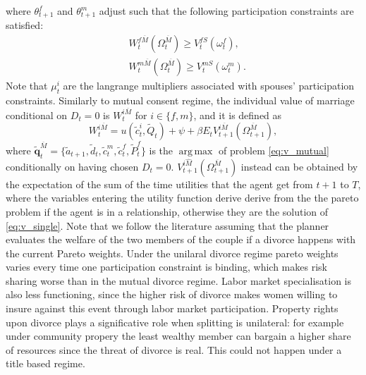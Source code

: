 \documentclass[12pt]{article}
\numberwithin{table}{section}
\DeclareMathOperator*{\argmax}{arg\,max}
\begin{document}
where $\theta^f_{t+1}$ and $\theta^m_{t+1}$ adjust such that the following participation constraints are satisfied:
\begin{equation}\label{eq:p_cons_mar}
\begin{split}
&
W^{f\overline{M}}_{t}(\Omega^{\overline{M}}_{t})\geq V_{t}^{fS}(\omega^f_{t}),\\ &
W^{m\overline{M}}_{t}(\Omega^{\overline{M}}_{t})\geq V_{t}^{mS}(\omega^m_{t}). 
\end{split}
\end{equation}
Note that $\mu^i_t$ are the langrange multipliers associated with spouses' participation constraints.
Similarly to mutual consent regime, the individual value of marriage conditional on $D_t=0$ is  $W_{t}^{i\overline{M}}$ for $i\in\{f,m\}$, and it is defined as 
\begin{equation}
W_{t}^{i\overline{M}}=u(\tilde{c}_t^{i},\tilde{Q}_t)+\psi+\beta E_t V_{t+1}^{i\overline{M}}(\Omega^{\overline{M}}_{t+1}),
\end{equation}
where
$\mathbf{\tilde{q}}^{\overline{M}}_t=\{\tilde{a}_{t+1},\tilde{d}_{t},\tilde{c}^{m}_{t},\tilde{c}^{f}_{t},\tilde{P}^{f}_t\}$ is the $\argmax$ of problem \eqref{eq:v_mutual} conditionally on having chosen $D_t=0$. $V_{t+1}^{i\hat{M}}(\Omega^{\overline{M}}_{t+1})$ instead can be obtained by the expectation of the sum of the time utilities that the agent get from $t+1$ to $T$, where the variables entering the utility function derive derive from the the pareto problem if the agent is in a relationship, otherwise they are the solution of \eqref{eq:v_single}. Note that we follow the literature assuming that the planner evaluates the welfare of the two members of the couple if a divorce happens with the current Pareto weights.
Under the unilaral divorce regime pareto weights varies every time one participation constraint is binding, which makes risk sharing worse than in the mutual divorce regime. Labor market specialisation is also less functioning, since the higher risk of divorce makes women willing to insure against this event through labor market participation. Property rights upon divorce plays a significative role when splitting is unilateral: for example under community propery the least wealthy member can bargain a higher share of resources since the threat of divorce is real. This could not happen under a title based regime.
\end{document}
